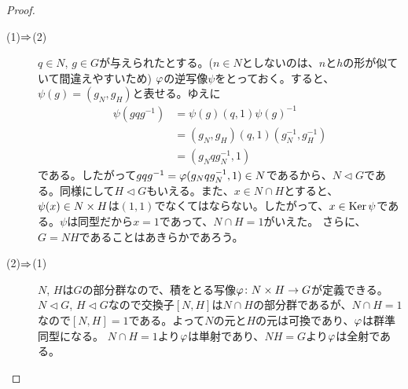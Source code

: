 \documentclass[10pt]{jsarticle}%
\begin{document}
\begin{proof} ${}$
  \begin{description}
    \item[(1)$\Rightarrow$(2)] $q \in N$, $g \in G$が与えられたとする。($n \in N$としないのは、$n$と$h$の形が似ていて間違えやすいため) ${\varphi}$の逆写像$\psi$をとっておく。すると、$\psi(g) = (g_N, g_H)$と表せる。ゆえに
    \begin{align*}
      \psi(gqg^{-1}) &= \psi(g) (q,1) \psi(g)^{-1} \\
      &= (g_N,g_H) (q,1) (g_N^{-1}, g_H^{-1}) \\
      &= ( g_N q g_N^{-1} , 1)
    \end{align*}
    である。したがって$gqg^{-1} = {\varphi}(g_N q g_N^{-1} , 1) \in N$であるから、$N \lhd G$である。同様にして$H \lhd G$もいえる。また、$x \in N \cap H$とすると、$\psi(x) \in N \times H$は$(1,1)$でなくてはならない。したがって、$x \in \operatorname{Ker} \psi$である。$\psi$は同型だから$x=1$であって、$N \cap H =1$がいえた。
    さらに、$G = NH$であることはあきらかであろう。
    \item[(2)$\Rightarrow$(1)] $N$, $H$は$G$の部分群なので、積をとる写像${\varphi} \colon N \times H \to G$が定義できる。$N \lhd G$, $H \lhd G$なので交換子$[N,H]$は$N \cap H$の部分群であるが、$N \cap H = 1$なので$[N,H] = 1$である。よって$N$の元と$H$の元は可換であり、${\varphi}$は群準同型になる。
    $N \cap H = 1$より${\varphi}$は単射であり、$NH=G$より${\varphi}$は全射である。
  \end{description}
\end{proof}
\end{document}

